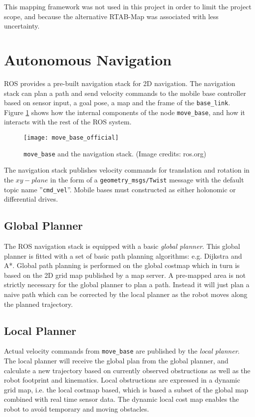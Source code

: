 This mapping framework was not used in this project in order to limit the project scope, and because the alternative \ac{RTAB-Map} was associated with less uncertainty.

\section{Autonomous Navigation}
\label{sec:navigation_theory}
\ac{ROS} provides a pre-built navigation stack for 2D navigation. The navigation stack can plan a path and send velocity commands to the mobile base controller based on sensor input, a goal pose, a map and the frame of the \texttt{base\_link}. Figure \ref{fig:move_base_official} shows how the internal components of the node \texttt{move\_base}, and how it interacts with the rest of the \ac{ROS} system. 

\begin{figure}[h]
    \centering
    \texttt{[image: move\_base\_official]}
    \caption{\texttt{move\_base} and the navigation stack. (Image credits:  ros.org)}
    \label{fig:move_base_official}
\end{figure}

The navigation stack publishes velocity commands for translation and rotation in the $xy-plane$ in the form of a \texttt{geometry\_msgs/Twist} message with the default topic name ''\texttt{cmd\_vel}''. Mobile bases must constructed as either holonomic or differential drives.

\subsection{Global Planner}

The \ac{ROS} navigation stack is equipped with a basic \textit{global planner}. This global planner is fitted with a set of basic path planning algorithms: e.g. Dijkstra and A*. Global path planning is performed on the global costmap which in turn is based on the 2D grid map published by a map server. A pre-mapped area is not strictly necessary for the global planner to plan a path. Instead it will just plan a naive path which can be corrected by the local planner as the robot moves along the planned trajectory.

\subsection{Local Planner}

Actual velocity commands from \texttt{move\_base} are published by the \textit{local planner}. The local planner will receive the global plan from the global planner, and calculate a new trajectory based on currently observed obstructions as well as the robot footprint and kinematics. Local obstructions are expressed in a dynamic grid map, i.e. the local costmap based, which is based a subset of the global map combined with real time sensor data. The dynamic local cost map enables the robot to avoid temporary and moving obstacles.

